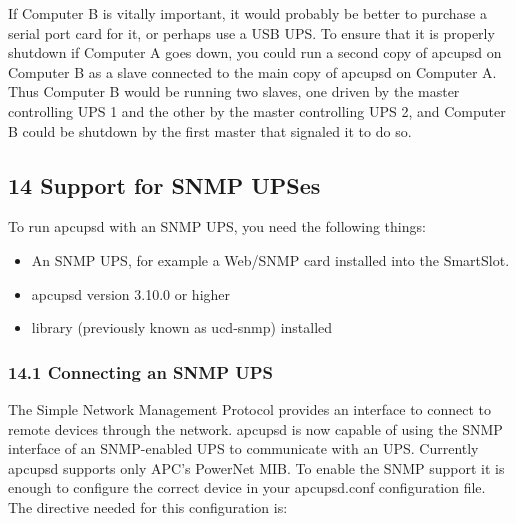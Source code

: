 If Computer B is vitally important, it would probably be better to purchase a
serial port card for it, or perhaps use a USB UPS. To ensure that it is
properly shutdown if Computer A goes down, you could run a second copy of
apcupsd on Computer B as a slave connected to the main copy of apcupsd on
Computer A. Thus Computer B would be running two slaves, one driven by the
master controlling UPS 1 and the other by the master controlling UPS 2, and
Computer B could be shutdown by the first master that signaled it to do so. 

\label{Support-for-SNMP-UPSes}

\subsection*{14 Support for SNMP UPSes}

\label{index-SNMP-162}
 To run apcupsd with an SNMP UPS, you need the
following things:  

\begin{itemize}
\item An SNMP UPS, for example a Web/SNMP card installed into the SmartSlot.  
\item apcupsd version 3.10.0 or higher  
\item 
{} library (previously known as
ucd-snmp) installed 
\end{itemize}

\label{Connecting-an-SNMP-UPS}

\subsubsection*{14.1 Connecting an SNMP UPS}

\label{index-SNMP_002c-Connecting-163}
The Simple Network Management Protocol provides an interface to connect to
remote devices through the network. apcupsd is now capable of using the SNMP
interface of an SNMP-enabled UPS to communicate with an UPS. Currently apcupsd
supports only APC's PowerNet MIB. To enable the SNMP support it is enough to
configure the correct device in your apcupsd.conf configuration file. The
directive needed for this configuration is: 

